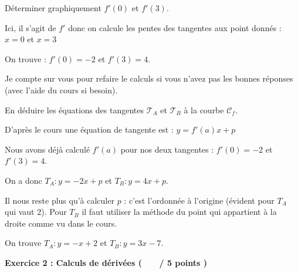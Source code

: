 \documentclass[12pt,a4paper]{exam}
\begin{document}
\begin{questions}

\question[2] Déterminer graphiquement $f'(0)$ et $f'(3)$.

{\color{red}Ici, il s'agit de $f'$ donc on calcule les pentes des tangentes aux point donnés : $x=0$ et $x=3$

On trouve : $f'(0)=-2$ et $f'(3) = 4$.

Je compte sur vous pour refaire le calculs si vous n'avez pas les bonnes réponses (avec l'aide du cours si besoin).}

\question[3] En déduire les équations des tangentes $\mathcal{T}_A$ et $\mathcal{T}_B$ à 
la courbe $\mathcal{C}_f$.

{\color{red}D'après le cours une équation de tangente est : $y = f'(a)x + p$

Nous avons déjà calculé $f'(a)$ pour nos deux tangentes : $f'(0)=-2$ et $f'(3) = 4$.

On a donc $T_A : y = -2x+p$ et $T_B : y = 4x + p$.

Il nous reste plus qu'à calculer $p$ : c'est l'ordonnée à l'origine (évident pour $T_A$ qui vaut $2$). Pour 
$T_B$ il faut utiliser la méthode du point qui appartient à la droite comme vu dans le cours.

On trouve $T_A : y = -x+2$ et $T_B : y = 3x - 7$.
}

\end{questions}

\vspace{1cm}

\noindent
\textbf{Exercice 2 : Calculs de dérivées ( \ \ \ / 5 points )}

\vspace{10pt}
\noindent
\end{document}

